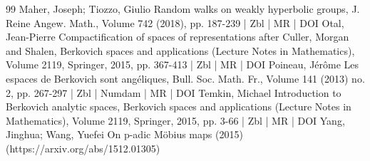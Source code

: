 \begin{thebibliography}{99}
Maher, Joseph; Tiozzo, Giulio Random walks on weakly hyperbolic groups, J. Reine Angew. Math., Volume 742 (2018), pp. 187-239 | Zbl | MR | DOI
Otal, Jean-Pierre Compactification of spaces of representations after Culler, Morgan and Shalen, Berkovich spaces and applications (Lecture Notes in Mathematics), Volume 2119, Springer, 2015, pp. 367-413 | Zbl | MR | DOI
Poineau, Jérôme Les espaces de Berkovich sont angéliques, Bull. Soc. Math. Fr., Volume 141 (2013) no. 2, pp. 267-297 | Zbl | Numdam | MR | DOI
Temkin, Michael Introduction to Berkovich analytic spaces, Berkovich spaces and applications (Lecture Notes in Mathematics), Volume 2119, Springer, 2015, pp. 3-66 | Zbl | MR | DOI
Yang, Jinghua; Wang, Yuefei On p-adic Möbius maps (2015) (https://arxiv.org/abs/1512.01305)
\end{thebibliography}
